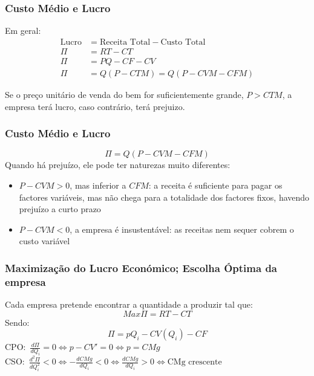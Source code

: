 \begin{frame}
	\frametitle{Custo M\'edio e Lucro}
	Em geral:
	\begin{align*}
		\text{Lucro} &= \text{Receita Total} - \text{Custo Total}\\
		\Pi &= RT - CT \\
		\Pi &= PQ-CF-CV \\
		\Pi &= Q(P-CTM) = Q(P-CVM-CFM)
	\end{align*}

	Se o pre\c co unit\'ario de venda do bem for suficientemente grande, $P>CTM$, a empresa ter\'a lucro, caso contr\'ario, ter\'a prejuizo.
\end{frame}

\begin{frame}
	\frametitle{Custo M\'edio e Lucro}
	\[\Pi=Q(P-CVM-CFM)\]
	Quando h\'a preju\'izo, ele pode ter naturezas muito diferentes:
	\begin{itemize}
		\item $P-CVM>0$, mas inferior a $CFM$: a receita \'e suficiente para pagar os factores vari\'aveis, mas n\~ao chega para a totalidade dos factores fixos, havendo preju\'izo a curto prazo
		\item $P-CVM<0$, a empresa \'e insustent\'avel: as receitas nem sequer cobrem o custo vari\'avel
	\end{itemize}
\end{frame}

\begin{frame}
	\frametitle{Maximiza\c c\~ao do Lucro Econ\'omico; Escolha \'Optima da empresa}
	Cada empresa pretende encontrar a quantidade a produzir tal que: \[Max \Pi = RT-CT\]
	Sendo:\[\Pi=pQ_i-CV(Q_i)-CF\]
	CPO:\ \(\frac{d\Pi}{dQ_i} = 0 \Leftrightarrow p-CV'=0\Leftrightarrow p=CMg\) \\
	CSO:\ \(\frac{d^2\Pi}{dQ_i^2} < 0 \Leftrightarrow -\frac{dCMg}{dQ_i}<0\Leftrightarrow\frac{dCMg}{dQ_i}>0 \Leftrightarrow \text{CMg crescente}\)
\end{frame}

